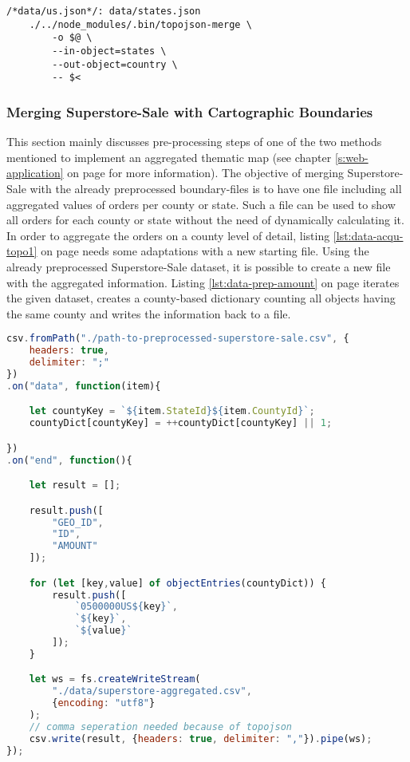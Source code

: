 \begin{lstlisting}[style={makefile}, caption={Make task for converting state boundaries to a county boundary}, label={lst:data-acqu-topo3}]
/*data/us.json*/: data/states.json
    ./../node_modules/.bin/topojson-merge \
        -o $@ \
        --in-object=states \
        --out-object=country \
        -- $<
\end{lstlisting}

\subsubsection{Merging Superstore-Sale with Cartographic Boundaries}
This section mainly discusses pre-processing steps of one of the two methods mentioned to implement an aggregated thematic map (see chapter \ref{s:web-application} on page \pageref{s:web-application} for more information). The objective of merging Superstore-Sale with the already preprocessed boundary-files is to have one file including all aggregated values of orders per county or state. Such a file can be used to show all orders for each county or state without the need of dynamically calculating it.
In order to aggregate the orders on a county level of detail, listing \ref{lst:data-acqu-topo1} on page \pageref{lst:data-acqu-topo1} needs some adaptations with a new starting file. Using the already preprocessed Superstore-Sale dataset, it is possible to create a new file with the aggregated information. Listing \ref{lst:data-prep-amount} on page \pageref{lst:data-prep-amount} iterates the given dataset, creates a county-based dictionary counting all objects having the same county and writes the information back to a file.

\begin{lstlisting}[language=JavaScript, caption={Creating the file containing aggregation information}, label={lst:data-prep-amount}]
csv.fromPath("./path-to-preprocessed-superstore-sale.csv", {
    headers: true,
    delimiter: ";"
})
.on("data", function(item){

    let countyKey = `${item.StateId}${item.CountyId}`;
    countyDict[countyKey] = ++countyDict[countyKey] || 1;

})
.on("end", function(){

    let result = [];

    result.push([
        "GEO_ID",
        "ID",
        "AMOUNT"
    ]);

    for (let [key,value] of objectEntries(countyDict)) {
        result.push([
            `0500000US${key}`,
            `${key}`,
            `${value}`
        ]);
    }

    let ws = fs.createWriteStream(
        "./data/superstore-aggregated.csv",
        {encoding: "utf8"}
    );
    // comma seperation needed because of topojson
    csv.write(result, {headers: true, delimiter: ","}).pipe(ws);
});
\end{lstlisting}

